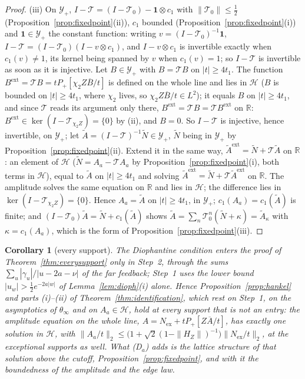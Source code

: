 \documentclass[11pt]{article}
\newtheorem{corollary}[theorem]{Corollary}
\theoremstyle{definition}
\theoremstyle{remark}
\newcommand{\R}{\mathbb{R}}
\begin{document}
\begin{proof}
(iii) On $\mathcal Y_+$, $I-\mathcal T=(I-\mathcal T_0)-\mathbf 1\otimes c_1$ with $\|\mathcal T_0\|\le\tfrac12$ (Proposition~\ref{prop:fixedpoint}(ii)), $c_1$ bounded (Proposition~\ref{prop:fixedpoint}(i)) and $\mathbf 1\in\mathcal Y_+$ the constant function: writing $v=(I-\mathcal T_0)^{-1}\mathbf 1$, $I-\mathcal T=(I-\mathcal T_0)(I-v\otimes c_1)$, and $I-v\otimes c_1$ is invertible exactly when $c_1(v)\ne1$, its kernel being spanned by $v$ when $c_1(v)=1$; so $I-\mathcal T$ is invertible as soon as it is injective. Let $B\in\mathcal Y_+$ with $B=\mathcal TB$ on $|t|\ge4t_1$. The function $B^{\mathrm{ext}}=\mathcal TB=tP_+[\chi_2Z\overline B/t]$ is defined on the whole line and lies in $\mathcal H$ ($B$ is bounded on $|t|\ge4t_1$, where $\chi_2$ lives, so $\chi_2Z\overline B/t\in L^2$); it equals $B$ on $|t|\ge4t_1$, and since $\mathcal T$ reads its argument only there, $B^{\mathrm{ext}}=\mathcal TB=\mathcal TB^{\mathrm{ext}}$ on $\R$: $B^{\mathrm{ext}}\in\ker(I-\mathcal T_{\chi_2Z})=\{0\}$ by (ii), and $B=0$. So $I-\mathcal T$ is injective, hence invertible, on $\mathcal Y_+$; let $\tilde A=(I-\mathcal T)^{-1}\tilde N\in\mathcal Y_+$, $\tilde N$ being in $\mathcal Y_+$ by Proposition~\ref{prop:fixedpoint}(ii). Extend it in the same way, $\tilde A^{\mathrm{ext}}=\tilde N+\mathcal T\tilde A$ on $\R$: an element of $\mathcal H$ ($\tilde N=A_a-\mathcal TA_a$ by Proposition~\ref{prop:fixedpoint}(i), both terms in $\mathcal H$), equal to $\tilde A$ on $|t|\ge4t_1$ and solving $\tilde A^{\mathrm{ext}}=\tilde N+\mathcal T\tilde A^{\mathrm{ext}}$ on $\R$. The amplitude solves the same equation on $\R$ and lies in $\mathcal H$; the difference lies in $\ker(I-\mathcal T_{\chi_2Z})=\{0\}$. Hence $A_a=\tilde A$ on $|t|\ge4t_1$, in $\mathcal Y_+$; $c_1(A_a)=c_1(\tilde A)$ is finite; and $(I-\mathcal T_0)\tilde A=\tilde N+c_1(\tilde A)$ shows $\tilde A=\sum_n\mathcal T_0^n(\tilde N+\kappa)=\tilde A_\kappa$ with $\kappa=c_1(A_a)$, which is the form of Proposition~\ref{prop:fixedpoint}(iii).
\end{proof}

\begin{corollary}[every support]\label{cor:allsupports}
The Diophantine condition enters the proof of Theorem~\ref{thm:everysupport} only in Step~2, through the sums $\sum_u|\gamma_u|/|u-2a-\nu|$ of the far feedback; Step~1 uses the lower bound $|u_w|>\tfrac12e^{-2a|w|}$ of Lemma~\ref{lem:dioph}(i) alone. Hence Proposition~\ref{prop:hankel} and parts (i)--(ii) of Theorem~\ref{thm:identification}, which rest on Step~1, on the asymptotics of $\theta_\infty$ and on $A_a\in\mathcal H$, hold at every support that is not an entry: the amplitude equation on the whole line, $A=N_{\mathrm{ex}}+tP_+[Z\overline A/t]$, has exactly one solution in $\mathcal H$, with $\|A_a/t\|_2\le\big(1+\sqrt2(1-\|H_Z\|)^{-1}\big)\|N_{\mathrm{ex}}/t\|_2$, at the exceptional supports as well. What (D$_a$) adds is the lattice structure of that solution above the cutoff, Proposition~\ref{prop:fixedpoint}, and with it the boundedness of the amplitude and the edge law.
\end{corollary}
\end{document}
